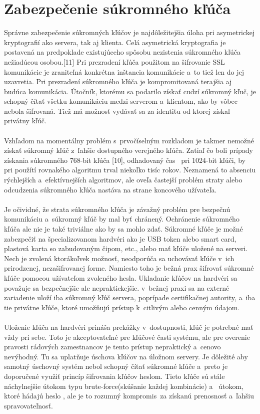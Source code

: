 \documentclass[
  printed, %
  notable,   %
  nolof,     %
    oneside,       %
  nolot,     %
]{fithesis3}
\begin{document}
\section{Zabezpečenie súkromného kľúča }
Správne zabezpečenie súkromných kľúčov je najdôležitejšia úloha pri asymetrickej kryptografií ako servera, tak aj klienta. Celá asymetrická kryptografia je postavená na predpoklade existujúceho spôsobu nezistenia súkromného kľúča nežiadúcou osobou.[11] Pri prezradení kľúča použitom na šifrovanie SSL komunikácie je zraniteľná konkrétna inštancia komunikácie a~to tiež len do jej uzavretia. Pri prezradení súkromného kľúča je kompromitovaná terajšia aj budúca komunikácia. Útočník, ktorému sa podarilo získať cudzí súkromný kľuč, je schopný čítať všetku komunikáciu medzi serverom a~klientom, ako by vôbec nebola šifrovaná. Tiež má možnosť vydávať sa za identitu od ktorej získal privátny kľúč.\paragraph{}
Vzhľadom na momentálny problém s~prvočíselným rozkladom je takmer nemožné získať súkromný kľúč z~ľahšie dostupného verejného kľúča. Zatiaľ čo boli prípady získania súkromného 768-bit kľúča [10], odhadovaný čas~ pri 1024-bit kľúči, by pri  použítí rovnakého algoritmu trval niekoľko tisíc rokov. Neznamená to absenciu rýchlejších a~efektívnejších algoritmov, ale oveľa častejší problém straty alebo odcudzenia súkromného kľúča nastáva na strane koncového užívateľa.\paragraph{}
Je očividné, že strata súkromného kľúča je závažný problém pre bezpečnú komunikáciu a~súkromný kľúč by mal byť chránený. Ochránenie súkromného kľúča ale nie je také triviálne ako by sa mohlo zdať. Súkromné kľúče je možné zabezpečiť na špecializovanom hardvéri ako je USB token alebo smart card, plastová karta so zabudovaným čipom, etc., alebo mať kľúče uložené na serveri. Nech je zvolená ktorákoľvek možnosť, neodporúča sa  uchovávať kľúče v~ich prirodzenej, nezašifrovanej forme. Namiesto toho je bežná prax šifrovať súkromné kľúče pomocou užívateľom zvoleného hesla. Ukladanie kľúčov na hardvéri sa považuje sa bezpečnejšie ale nepraktickejšie. v~bežnej praxi sa na externé zariadenie uloží iba súkromný kľúč servera, poprípade certifikačnej autority, a~iba tie privátne kľúče, ktoré umožňujú prístup k~citlivým alebo cenným údajom. \paragraph{}
Uloženie kľúča na hardvéri prináša prekážky v~dostupnosti, kľúč je potrebné mať vždy pri sebe. Toto je akceptovateľné pre kľúčové časti systému, ale pre overenie pravosti rádových zamestnancov je tento prístup nepraktický a~cenovo nevýhodný. Tu sa uplatňuje úschova kľúčov na úložnom servery. Je dôležité aby samotný úschovný systém nebol schopný čítať súkromné kľúče a~preto je doporučené využiť princíp šifrovania kľúčov heslom. Tieto kľúče sú stále náchylnejšie útokom typu brute-force(skúšanie každej kombinácie) a~ útokom, ktoré hádajú heslo , ale je to rozumný kompromis~za získanú prenosnosť a~ľahšiu spravovateľnosť.
 
\end{document}

